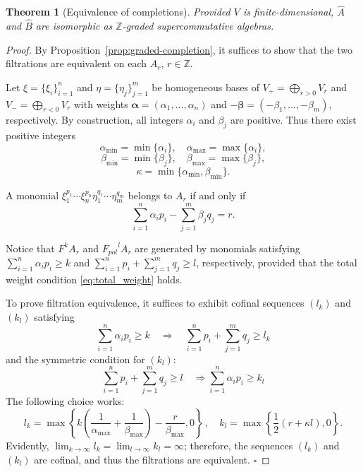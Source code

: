 \documentclass[a4paper,12pt]{amsart}
\newtheorem{theorem}{Theorem}
\newcommand{\Z}{{\mathbb Z}}
\begin{document}
\begin{theorem}[Equivalence of completions]\label{thm:equiv_compl}\normalfont
     Provided $V$ is finite-dimensional, $\widehat{A}$ and $\widehat{B}$ are isomorphic as $\Z$-graded supercommutative algebras.
\end{theorem}
\noindent
\begin{proof} By Proposition~\ref{prop:graded-completion}, it suffices to show that the two filtrations are equivalent on each $A_r$, $r\in\Z$. 

\medskip\noindent
Let ${\xi}=\{\xi_i\}_{i=1}^n$ and ${\eta}=\{\eta_j\}_{j=1}^m$ be homogeneous bases of $V_+ = \bigoplus_{r>0} V_r$ and $V_- = \bigoplus_{r<0} V_r$ with weights $\bm{\alpha}=(\alpha_1,\ldots, \alpha_n)$ and $-\bm{\beta}=(-\beta_1, \ldots, -\beta_m)$, respectively. By construction, all integers $\alpha_i$ and $\beta_j$ are positive. Thus there exist positive integers
\[
\alpha_{\min} = \min\{\alpha_i\}, \quad 
\alpha_{\max} = \max\{\alpha_i\},
\]
\[
\beta_{\min} = \min\{\beta_j\}, \quad 
\beta_{\max} = \max\{\beta_j\},
\]
\[
\kappa = \min\{\alpha_{\min}, \beta_{\min}\}.
\]

\noindent A monomial $\xi_1^{p_1} \cdots \xi_n^{p_n} \eta_1^{q_1} \cdots \eta_m^{q_m}$ belongs to $A_r$ if and only if
\begin{equation}\label{eq:total_weight}
\sum_{i=1}^n \alpha_i p_i - \sum_{j=1}^m \beta_j q_j = r.
\end{equation} 

\noindent Notice that $F^k A_r$ and ${F_{pol}}^l A_r$ are generated by monomials satisfying 
$\sum_{i=1}^n \alpha_i p_i \ge k$ and $\sum_{i=1}^n p_i + \sum_{j=1}^m q_j \ge l$, respectively, 
provided that the total weight condition \eqref{eq:total_weight} holds. 

\noindent To prove filtration equivalence, it suffices to exhibit cofinal sequences $(l_k)$ and $(k_l)$ satisfying
\begin{equation}\label{eq:F1_to_F2}
\sum_{i=1}^n \alpha_i p_i \ge k \quad \Rightarrow \quad \sum_{i=1}^n p_i + \sum_{j=1}^m q_j \ge l_k
\end{equation}
and the symmetric condition for $(k_l)$: 
\begin{equation}\label{eq:F2_to_F1}
  \sum_{i=1}^n p_i + \sum_{j=1}^m q_j \ge l \quad \Rightarrow \sum_{i=1}^n \alpha_i p_i \ge k_l  
\end{equation}
The following choice works:
\[
l_k =\max\left\{
k\left(
\frac{1}{\alpha_{\max}}+\frac{1}{\beta_{\max}}
\right)-
\frac{r}{\beta_{\max}},0
\right\}
\,,\quad
k_l=
\max\left\{
\frac{1}{2}(r+\kappa l),0
\right\}.
\]
Evidently, $\lim_{k\to\infty} l_k = \lim_{l\to\infty} k_l = \infty$; therefore, the sequences $(l_k)$ and $(k_l)$ are cofinal, and thus the filtrations are equivalent.
 $\square$  
\end{proof}
\end{document}
